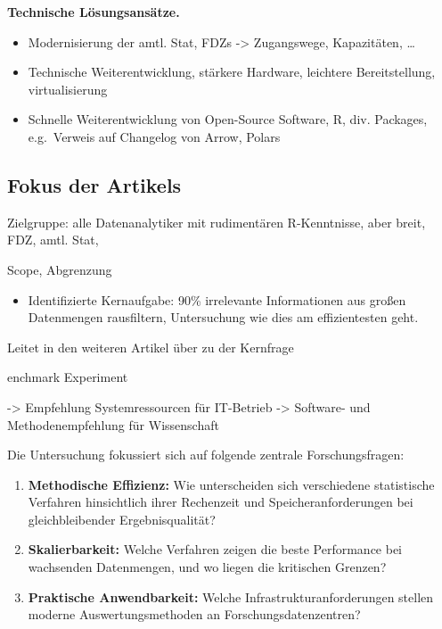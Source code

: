 \documentclass[
  german,
  10pt,
  twoside]{article}
\providecommand{\tightlist}{%
  \setlength{\itemsep}{0pt}\setlength{\parskip}{0pt}}
\begin{document}
\textbf{Technische Lösungsansätze.}

\begin{itemize}
\tightlist
\item
  Modernisierung der amtl. Stat, FDZs -\textgreater{} Zugangswege,
  Kapazitäten, \ldots{}
\item
  Technische Weiterentwicklung, stärkere Hardware, leichtere
  Bereitstellung, virtualisierung
\item
  Schnelle Weiterentwicklung von Open-Source Software, R, div. Packages,
  e.g.~Verweis auf Changelog von Arrow, Polars
\end{itemize}

\subsection{Fokus der Artikels}\label{fokus-der-artikels}

Zielgruppe: alle Datenanalytiker mit rudimentären R-Kenntnisse, aber
breit, FDZ, amtl. Stat,

Scope, Abgrenzung

\begin{itemize}
\tightlist
\item
  Identifizierte Kernaufgabe: 90\% irrelevante Informationen aus großen
  Datenmengen rausfiltern, Untersuchung wie dies am effizientesten geht.
\end{itemize}

Leitet in den weiteren Artikel über zu der Kernfrage

enchmark Experiment

-\textgreater{} Empfehlung Systemressourcen für IT-Betrieb
-\textgreater{} Software- und Methodenempfehlung für Wissenschaft

Die Untersuchung fokussiert sich auf folgende zentrale Forschungsfragen:

\begin{enumerate}
\def\labelenumi{\arabic{enumi}.}
\item
  \textbf{Methodische Effizienz:} Wie unterscheiden sich verschiedene
  statistische Verfahren hinsichtlich ihrer Rechenzeit und
  Speicheranforderungen bei gleichbleibender Ergebnisqualität?
\item
  \textbf{Skalierbarkeit:} Welche Verfahren zeigen die beste Performance
  bei wachsenden Datenmengen, und wo liegen die kritischen Grenzen?
\item
  \textbf{Praktische Anwendbarkeit:} Welche Infrastrukturanforderungen
  stellen moderne Auswertungsmethoden an Forschungsdatenzentren?
\end{enumerate}
\end{document}
